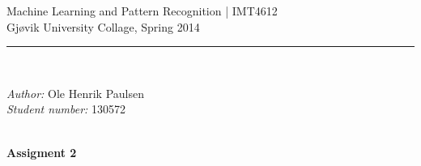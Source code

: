 \documentclass[a4paper,12pt,pdftex]{article}
\newcommand{\HRule}{\rule{\linewidth}{0.2mm}}
\def\name{Ole Henrik Paulsen}
\def\studentnumber{130572}
\def\course{Machine Learning and Pattern Recognition | IMT4612}
\def\school{Gjøvik University Collage}
\def\reportname{Assigment 2}
\def\semester{Spring 2014}
\begin{document}
\begin{titlepage}                                                               
    \begin{center}                                                                                                   
                                                                                
        \large \course\\                                                        
        \large \school, \semester\\[0.4cm]                                       
        \HRule\\[1.5cm]                                                         
                                                                                
        \begin{minipage}{0.4\textwidth}                                         
            \begin{flushleft}                                                   
                \small \emph{Author:} \name\\                                  
                \small \emph{Student number:} \studentnumber\\                  
            \end{flushleft}                                                     
        \end{minipage}                                                          
                                                                                
        \ \\[7.0cm]                                                             
        \LARGE\textbf{\reportname}                                              
                                                                                
    \end{center}                                                                
    \thispagestyle{titlefooter}                                                 
\end{titlepage}                                                                 
                                                                                
\tableofcontents                                                                
\clearpage   
\end{document}
